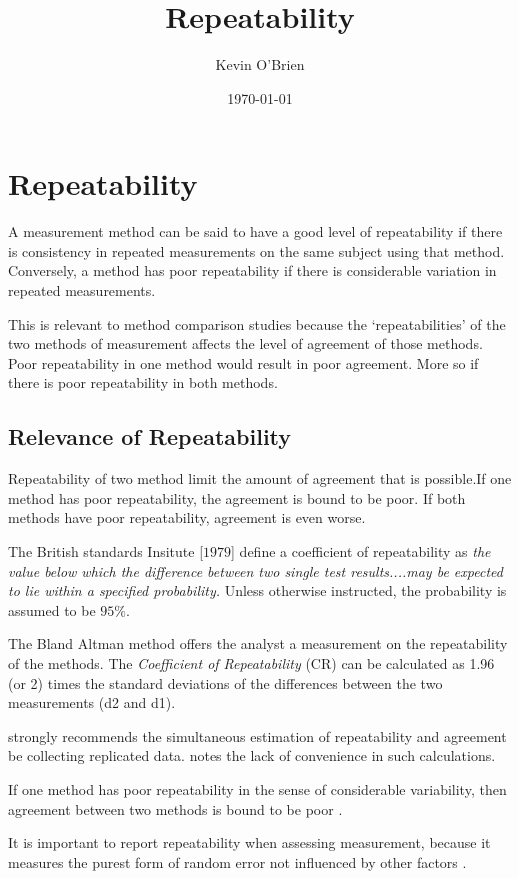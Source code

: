 \documentclass[12pt, a4paper]{article}
\begin{document}
\author{Kevin O'Brien}
\title{Repeatability}
\date{\today}
\maketitle
\section{Repeatability}
A measurement method can be said to have a good level of repeatability if there is consistency in repeated measurements on the same subject using that method. Conversely, a method has poor repeatability if there is considerable variation in repeated measurements.

This is relevant to method comparison studies because the `repeatabilities' of the two methods of measurement affects the level of agreement of those methods. Poor repeatability in one method would result in poor agreement. More so if there is poor repeatability in both methods.

\subsection{Relevance of Repeatability} Repeatability of two method limit the amount of agreement that is possible.If one method has poor repeatability, the agreement is bound to be poor. If both methods have poor repeatability, agreement is even worse.

The British standards Insitute [$1979$] define a coefficient of
repeatability  as \emph{the value below which the difference
between two single test results....may be expected to lie within a
specified probability.} Unless otherwise instructed, the
probability is assumed to be $95\%$.

The Bland Altman method offers the analyst a measurement on the repeatability of the methods. The \emph{Coefficient of Repeatability} (CR) can be calculated as 1.96 (or 2) times the standard deviations of the differences between the two measurements (d2 and d1).


\citet{BA99} strongly recommends the simultaneous estimation of repeatability and agreement be collecting replicated data. \citet{ARoy2009} notes the lack of convenience in such calculations.


If one method has poor repeatability in the sense of considerable variability, then agreement between two methods is bound to be poor \citep{ARoy2009}.

It is important to report repeatability when assessing measurement, because it measures the purest form of random error not influenced by other factors \citep{Barnhart}.


\end{document}
